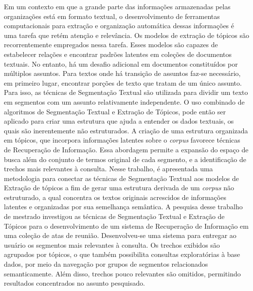 \setlength{\absparsep}{18pt} %
                     
\begin{resumo}

Em um contexto em que a grande parte das informações armazenadas pelas organizações está em formato textual, o desenvolvimento de ferramentas computacionais para extração e organização automática dessas informações é uma tarefa que retém atenção e relevância.
%
Os modelos de extração de tópicos são recorrentemente empregados nessa tarefa. Esses modelos são capazes de estabelecer relações e encontrar padrões latentes em coleções de documentos textuais.
%
No entanto, há um desafio adicional em documentos constituídos por múltiplos assuntos. Para textos onde há transição de assuntos faz-se necessário, em primeiro lugar, encontrar porções de texto que tratam de um único assunto. Para isso, as técnicas de Segmentação Textual são utilizada para dividir um texto em segmentos com um assunto relativamente independente.
%
%
%
%
%
O uso combinado de algoritmos de Segmentação Textual e Extração de Tópicos, pode então ser aplicado para criar uma estrutura que ajuda a entender os dados textuais, os quais são inerentemente não estruturados.
% 
A criação de uma estrutura organizada em tópicos, que incorpora informações latentes sobre o \textit{corpus} favorece técnicas de Recuperação de Informação. Essa abordagem permite a expansão do espaço de busca além do conjunto de termos original de cada segmento, e a identificação de trechos mais relevantes à consulta.
% 
Nesse trabalho, é apresentada uma metodologia para conectar as técnicas de Segmentação Textual aos modelos de Extração de tópicos a fim de gerar uma estrutura derivada de um \textit{corpus} não estruturado, a qual concentra os textos originais acrescidos de informações latentes e organizadas por sua semelhança semântica.
% 
% 
% 
% 
% 
% 
A pesquisa desse trabalho de mestrado investigou as técnicas de Segmentação Textual e Extração de Tópicos para o desenvolvimento de um sistema de Recuperação de Informação em uma coleção de atas de reunião. 
% 
Desenvolveu-se uma sistema para entregar ao usuário os segmentos mais relevantes à consulta. Os trechos exibidos são agrupados por tópicos, o que também possibilita consultas exploratórias à base dados, por meio da navegação por grupos de segmentos relacionados semanticamente. Além disso, trechos pouco relevantes são omitidos, permitindo resultados concentrados no assunto pesquisado.

\end{resumo}

